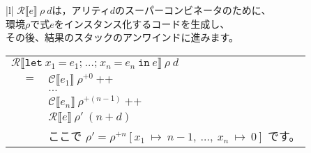\documentclass{jarticle}
\begin{document}
\begin{tabular} {|l|} \hline
	$\mathcal{R} \llbracket e \rrbracket ~ \rho ~ d$は，アリティ$d$のスーパーコンビネータのために、               \\
	環境$\rho$で式$e$をインスタンス化するコードを生成し、                                                         \\
	その後、結果のスタックのアンワインドに進みます。                                                              \\
	\begin{tabular}{r c l}
		\multicolumn{3}{l}{$\mathcal{R} \llbracket \texttt{let} ~ x_1 ~ \texttt{=} ~ e_1\texttt{;} ~  \ldots \texttt{;} ~ x_n ~ \texttt{=} ~ e_n ~ \texttt{in} ~ e \rrbracket ~ \rho ~ d$}                                                                                                                           \\
		                                                                                      & $=$ & $\mathcal{C} \llbracket e_1 \rrbracket ~ \rho^{+0} ~ \texttt{++}$                                                                                                                                              \\
		                                                                                      &     & $\ldots$                                                                                                                                                                                                       \\
		                                                                                      &     & $\mathcal{C} \llbracket e_n \rrbracket ~ \rho^{+(n - 1)} ~ \texttt{++}$                                                                                                                                        \\
		                                                                                      &     & $\mathcal{R} \llbracket e \rrbracket ~ \rho' ~ (n + d)$                                                                                                                                                        \\
		                                                                                      &     & ここで $\rho' = \rho^{+n} \left[x_1 ~ \mapsto ~ n - 1, ~ \ldots , ~ x_n ~ \mapsto ~ 0\right]$ です。                                                                                                           \\

\end{tabular}
\end{tabular}
\end{document}
